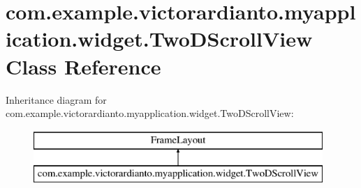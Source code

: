 \hypertarget{classcom_1_1example_1_1victorardianto_1_1myapplication_1_1widget_1_1_two_d_scroll_view}{}\section{com.\+example.\+victorardianto.\+myapplication.\+widget.\+Two\+D\+Scroll\+View Class Reference}
\label{classcom_1_1example_1_1victorardianto_1_1myapplication_1_1widget_1_1_two_d_scroll_view}
Inheritance diagram for com.\+example.\+victorardianto.\+myapplication.\+widget.\+Two\+D\+Scroll\+View\+:\begin{figure}[H]
\begin{center}
\leavevmode
\includegraphics[height=2.000000cm]{classcom_1_1example_1_1victorardianto_1_1myapplication_1_1widget_1_1_two_d_scroll_view}
\end{center}
\end{figure}
